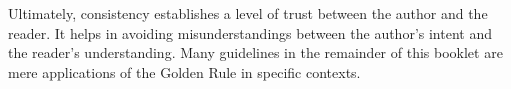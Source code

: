 Ultimately, consistency establishes a level of trust between the author and the reader.
It helps in avoiding misunderstandings between the author's intent and the reader's understanding.
Many guidelines in the remainder of this booklet are mere applications of the Golden Rule in specific contexts.


